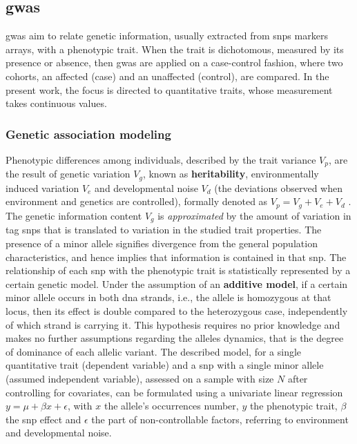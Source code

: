 \subsection{\Acs{gwas}}
\Acf{gwas} aim to relate genetic information, usually extracted from \acfp{snp} markers arrays, with a phenotypic trait. When the trait is dichotomous, measured by its presence or absence, then \ac{gwas} are applied on a case-control fashion, where two cohorts, an affected (case) and an unaffected (control), are compared. \cite{Uffelmann2021} In the present work, the focus is directed to quantitative traits, whose measurement takes continuous values. 


\subsubsection{Genetic association modeling}
Phenotypic differences among individuals, described by the trait variance $V_p$,  are the result of genetic variation $V_g$, known as \textbf{heritability}, environmentally induced variation $V_e$ and developmental noise $V_d$ (the deviations observed when environment and genetics are controlled), formally denoted as $V_p=V_g+V_e+V_d$ \cite{Vogt2020}. The genetic information content $V_g$ is \textit{approximated} by the amount of variation in tag \acp{snp} that is translated to variation in the studied trait properties.  The presence of a minor allele signifies divergence from the general population characteristics, and hence implies that information is contained in that \ac{snp}.  The relationship of each \ac{snp} with the phenotypic trait is statistically represented by a certain genetic model. Under the assumption of an \textbf{additive model}, if a certain minor allele occurs in both \ac{dna} strands, i.e., the allele is homozygous at that locus, then its effect is double compared to the heterozygous case, independently of which strand is carrying it. This hypothesis requires no prior knowledge and makes no further assumptions regarding the alleles dynamics, that is the degree of dominance of each allelic variant.  The described model, for a single quantitative trait (dependent variable) and a \ac{snp} with a single minor allele (assumed independent variable), assessed on a sample with size $N$ after controlling for covariates, can be formulated using a univariate linear regression $y = \mu + \beta x + \epsilon$, with $x$ the allele's occurrences number, $y$ the phenotypic trait, $\beta$ the \ac{snp} effect and $\epsilon$ the part of non-controllable factors, referring to environment and developmental noise. 

